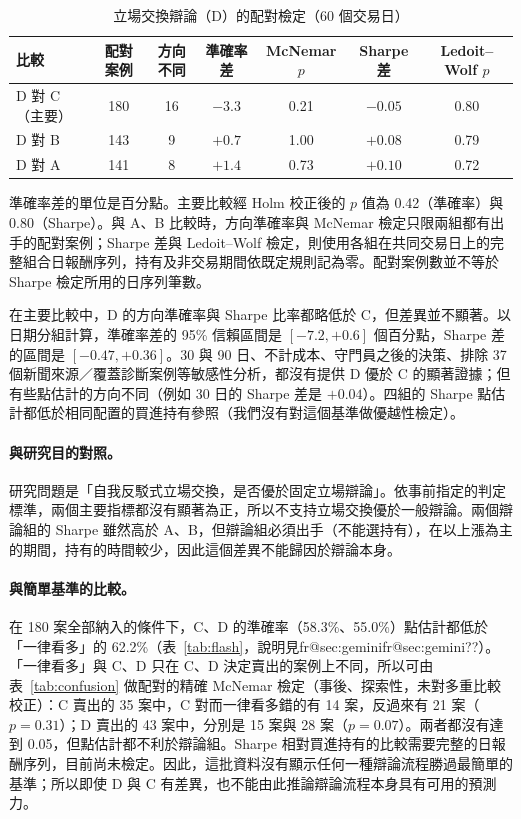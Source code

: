 \documentclass[12pt,a4paper]{article}
\makeatletter
\numberwithin{table}{section}
\numberwithin{figure}{section}
\newcommand{\frref}[1]{\ifcsname fr@#1\endcsname\csname fr@#1\endcsname\else ??\fi}
\newcommand{\grp}[1]{\textsf{#1}}
\makeatother
\begin{document}
\begin{table}[H]
\centering\small
\caption{立場交換辯論（\grp{D}）的配對檢定（60 個交易日）}
\label{tab:tests}
\setlength{\tabcolsep}{4pt}
\begin{tabular}{@{}lcccccc@{}}
\toprule
比較 & 配對案例 & 方向不同 & 準確率差 & McNemar $p$ & Sharpe 差 & Ledoit--Wolf $p$ \\
\midrule
\grp{D} 對 \grp{C}（主要） & 180 & 16 & $-3.3$ & 0.21 & $-0.05$ & 0.80 \\
\grp{D} 對 \grp{B} & 143 & 9 & $+0.7$ & 1.00 & $+0.08$ & 0.79 \\
\grp{D} 對 \grp{A} & 141 & 8 & $+1.4$ & 0.73 & $+0.10$ & 0.72 \\
\bottomrule
\end{tabular}
\par\smallskip
\raggedright\footnotesize 準確率差的單位是百分點。主要比較經 Holm 校正後的 $p$ 值為 0.42（準確率）與 0.80（Sharpe）。與 \grp{A}、\grp{B} 比較時，方向準確率與 McNemar 檢定只限兩組都有出手的配對案例；Sharpe 差與 Ledoit--Wolf 檢定，則使用各組在共同交易日上的完整組合日報酬序列，持有及非交易期間依既定規則記為零。配對案例數並不等於 Sharpe 檢定所用的日序列筆數。
\end{table}

在主要比較中，\grp{D} 的方向準確率與 Sharpe 比率都略低於 \grp{C}，但差異並不顯著。以日期分組計算，準確率差的 95\% 信賴區間是 $[-7.2, +0.6]$ 個百分點，Sharpe 差的區間是 $[-0.47,+0.36]$。30 與 90 日、不計成本、守門員之後的決策、排除 37 個新聞來源／覆蓋診斷案例等敏感性分析，都沒有提供 \grp{D} 優於 \grp{C} 的顯著證據；但有些點估計的方向不同（例如 30 日的 Sharpe 差是 $+0.04$）。四組的 Sharpe 點估計都低於相同配置的買進持有參照（我們沒有對這個基準做優越性檢定）。

\paragraph{與研究目的對照。} 研究問題是「自我反駁式立場交換，是否優於固定立場辯論」。依事前指定的判定標準，兩個主要指標都沒有顯著為正，所以不支持立場交換優於一般辯論。兩個辯論組的 Sharpe 雖然高於 \grp{A}、\grp{B}，但辯論組必須出手（不能選持有），在以上漲為主的期間，持有的時間較少，因此這個差異不能歸因於辯論本身。

\paragraph{與簡單基準的比較。} 在 180 案全部納入的條件下，\grp{C}、\grp{D} 的準確率（58.3\%、55.0\%）點估計都低於「一律看多」的 62.2\%（表~\ref{tab:flash}，說明見\frref{sec:gemini}）。「一律看多」與 C、D 只在 C、D 決定賣出的案例上不同，所以可由表~\ref{tab:confusion} 做配對的精確 McNemar 檢定（事後、探索性，未對多重比較校正）：C 賣出的 35 案中，C 對而一律看多錯的有 14 案，反過來有 21 案（$p=0.31$）；D 賣出的 43 案中，分別是 15 案與 28 案（$p=0.07$）。兩者都沒有達到 0.05，但點估計都不利於辯論組。Sharpe 相對買進持有的比較需要完整的日報酬序列，目前尚未檢定。因此，這批資料沒有顯示任何一種辯論流程勝過最簡單的基準；所以即使 \grp{D} 與 \grp{C} 有差異，也不能由此推論辯論流程本身具有可用的預測力。
\end{document}
